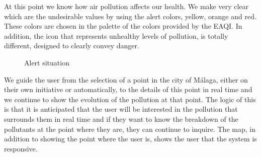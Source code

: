 At this point we know how air pollution affects our health.
We make very clear which are the undesirable values by using the alert colors, yellow, orange and red.
These colors are chosen in the palette of the colors provided by the EAQI.
In addition, the icon that represents unhealthy levels of pollution, is totally different, designed to clearly convey danger. \\

\begin{figure}[ht]
    \centering
    \hfill
    \caption{Alert situation}
\end{figure}

We guide the user from the selection of a point in the city of Málaga, either on their own initiative
or automatically, to the details of this point in real time and we continue to show the evolution of the pollution at that point.
The logic of this is that it is anticipated that the user will be interested in the pollution that surrounds them in real time and if
they want to know the breakdown of the pollutants at the point where they are, they can continue to inquire.
The map, in addition to showing the point where the user is, shows the user that the system is responsive.